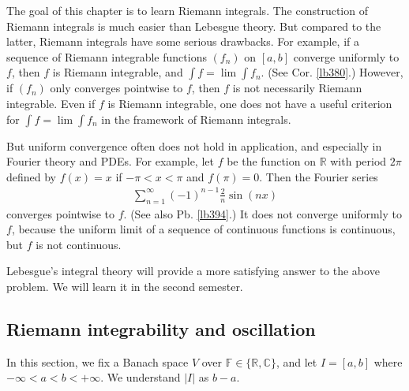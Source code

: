 \documentclass[12pt,b5paper,notitlepage]{article}
\theoremstyle{definition}
\theoremstyle{plain}
\newcommand{\Cbb}{\mathbb C}
\newcommand{\Rbb}{\mathbb R}
\newcommand{\Fbb}{\mathbb F}
\newcommand{\eps}{\varepsilon}
\numberwithin{equation}{section}
\begin{document}




The goal of this chapter is to learn Riemann integrals. The construction of Riemann integrals is much easier than Lebesgue theory. But compared to the latter, Riemann integrals have some serious drawbacks. For example, if a sequence of Riemann integrable functions $(f_n)$ on $[a,b]$ converge uniformly to $f$, then $f$ is Riemann integrable, and $\int f=\lim \int f_n$. (See Cor. \ref{lb380}.) However, if $(f_n)$ only converges pointwise to $f$, then $f$ is not necessarily Riemann integrable. Even if $f$ is Riemann integrable, one does not have a useful criterion for $\int f=\lim \int f_n$ in the framework of Riemann integrals. 

But uniform convergence often does not hold in application, and especially in Fourier theory and PDEs. For example, let $f$ be the function on $\Rbb$ with period $2\pi$ defined by $f(x)=x$ if $-\pi<x<\pi$ and $f(\pi)=0$. Then the Fourier series
\begin{align}
\sum_{n=1}^\infty (-1)^{n-1}\frac 2n\sin(nx)
\end{align}
converges pointwise to $f$. (See also Pb. \ref{lb394}.) It does not converge uniformly to $f$, because the uniform limit of a sequence of continuous functions is continuous, but $f$ is not continuous.



Lebesgue's integral theory will provide a more satisfying answer to the above problem. We will learn it in the second semester.




\subsection{Riemann integrability and oscillation}

In this section, we fix a Banach space $V$ over $\Fbb\in\{\Rbb,\Cbb\}$, and let $I=[a,b]$ where $-\infty<a<b<+\infty$. We understand $|I|$ as $b-a$. 
\end{document}
